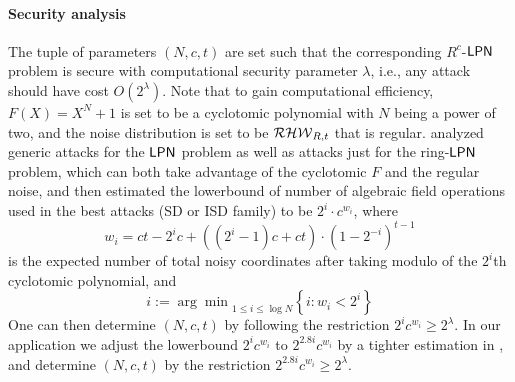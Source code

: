 \paragraph{Security analysis}The tuple of parameters $(N,c,t)$ are set such that the corresponding $R^c$-${\sf LPN}$ problem is secure with computational security parameter $\lambda$, i.e., any attack should have cost $O(2^\lambda)$. Note that to gain computational efficiency, $F(X) = X^N+1$ is set to be a cyclotomic polynomial with $N$ being a power of two, and the noise distribution is set to be $\mathcal{RHW}_{R,t}$ that is regular. \cite{cryptoeprint:2022/1035} analyzed generic attacks for the ${\sf LPN}$ problem as well as attacks just for the ring-${\sf LPN}$ problem, which can both take advantage of the cyclotomic $F$ and the regular noise, and then estimated the lowerbound of number of algebraic field operations used in the best attacks (SD or ISD family) to be $2^i\cdot c^{w_i}$, where \[
w_i=ct-2^ic+((2^i-1)c+ct)\cdot \left(1-2^{-i}\right)^{t-1}
\] is the expected number of total noisy coordinates after taking modulo of the $2^i$th cyclotomic polynomial, and
\[
i:={\arg\min}_{1\le i\le \log N}\left\{i:w_i<2^i\right\}
\]
One can then determine $(N,c,t)$ by following the restriction $2^ic^{w_i} \ge 2^\lambda$. In our application we adjust the lowerbound $2^i c^{w_i}$ to $2^{2.8i}c^{w_i}$ by a tighter estimation in \cite{cryptoeprint:2022/712}, and determine $(N,c,t)$ by the restriction $2^{2.8i}c^{w_i}\ge 2^\lambda$. 



